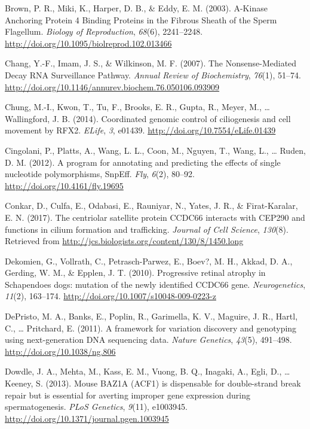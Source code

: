 \documentclass[12pt,twoside]{reedthesis}
\theoremstyle{definition}
\theoremstyle{definition}
\theoremstyle{remark}
\begin{document}
  \hypertarget{ref-Brown2003}{}
  Brown, P. R., Miki, K., Harper, D. B., \& Eddy, E. M. (2003). A-Kinase
  Anchoring Protein 4 Binding Proteins in the Fibrous Sheath of the Sperm
  Flagellum. \emph{Biology of Reproduction}, \emph{68}(6), 2241--2248.
  \url{http://doi.org/10.1095/biolreprod.102.013466}
  
  \hypertarget{ref-Chang2007}{}
  Chang, Y.-F., Imam, J. S., \& Wilkinson, M. F. (2007). The
  Nonsense-Mediated Decay RNA Surveillance Pathway. \emph{Annual Review of
  Biochemistry}, \emph{76}(1), 51--74.
  \url{http://doi.org/10.1146/annurev.biochem.76.050106.093909}
  
  \hypertarget{ref-Chung2014}{}
  Chung, M.-I., Kwon, T., Tu, F., Brooks, E. R., Gupta, R., Meyer, M.,
  \ldots{} Wallingford, J. B. (2014). Coordinated genomic control of
  ciliogenesis and cell movement by RFX2. \emph{ELife}, \emph{3}, e01439.
  \url{http://doi.org/10.7554/eLife.01439}
  
  \hypertarget{ref-Cingolani2012}{}
  Cingolani, P., Platts, A., Wang, L. L., Coon, M., Nguyen, T., Wang, L.,
  \ldots{} Ruden, D. M. (2012). A program for annotating and predicting
  the effects of single nucleotide polymorphisms, SnpEff. \emph{Fly},
  \emph{6}(2), 80--92. \url{http://doi.org/10.4161/fly.19695}
  
  \hypertarget{ref-Conkar2017}{}
  Conkar, D., Culfa, E., Odabasi, E., Rauniyar, N., Yates, J. R., \&
  Firat-Karalar, E. N. (2017). The centriolar satellite protein CCDC66
  interacts with CEP290 and functions in cilium formation and trafficking.
  \emph{Journal of Cell Science}, \emph{130}(8). Retrieved from
  \url{http://jcs.biologists.org/content/130/8/1450.long}
  
  \hypertarget{ref-Dekomien2010}{}
  Dekomien, G., Vollrath, C., Petrasch-Parwez, E., Boev?, M. H., Akkad, D.
  A., Gerding, W. M., \& Epplen, J. T. (2010). Progressive retinal atrophy
  in Schapendoes dogs: mutation of the newly identified CCDC66 gene.
  \emph{Neurogenetics}, \emph{11}(2), 163--174.
  \url{http://doi.org/10.1007/s10048-009-0223-z}
  
  \hypertarget{ref-DePristo2011}{}
  DePristo, M. A., Banks, E., Poplin, R., Garimella, K. V., Maguire, J.
  R., Hartl, C., \ldots{} Pritchard, E. (2011). A framework for variation
  discovery and genotyping using next-generation DNA sequencing data.
  \emph{Nature Genetics}, \emph{43}(5), 491--498.
  \url{http://doi.org/10.1038/ng.806}
  
  \hypertarget{ref-Dowdle2013}{}
  Dowdle, J. A., Mehta, M., Kass, E. M., Vuong, B. Q., Inagaki, A., Egli,
  D., \ldots{} Keeney, S. (2013). Mouse BAZ1A (ACF1) is dispensable for
  double-strand break repair but is essential for averting improper gene
  expression during spermatogenesis. \emph{PLoS Genetics}, \emph{9}(11),
  e1003945. \url{http://doi.org/10.1371/journal.pgen.1003945}
  
\end{document}
